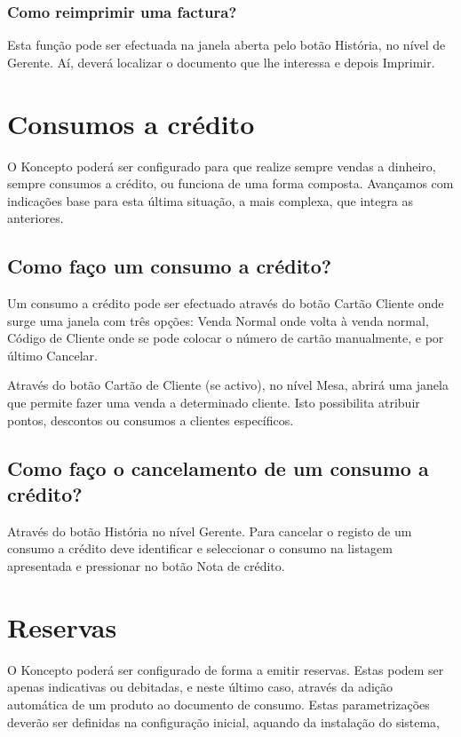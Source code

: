 \documentclass[a4paper,11pt,openany]{memoir}
\begin{document}
\subsection{Como reimprimir uma factura?}
Esta função pode ser efectuada na janela aberta pelo botão História, no nível de
Gerente. Aí, deverá localizar o documento que lhe interessa e depois Imprimir.




\chapter{Consumos a crédito}

O Koncepto poderá ser configurado para que realize sempre vendas a dinheiro,
sempre consumos a crédito, ou funciona de uma forma composta. Avançamos com
indicações base para esta última situação, a mais complexa, que integra as
anteriores.

\section{Como faço um consumo a crédito?}
Um consumo a crédito pode ser efectuado através do botão Cartão Cliente onde
surge uma janela com três opções: Venda Normal onde volta à venda normal,
Código de Cliente onde se pode colocar o número de cartão manualmente, e por
último Cancelar.

Através do botão Cartão de Cliente (se activo), no nível Mesa, abrirá uma janela que
permite fazer uma venda a determinado cliente. Isto possibilita atribuir pontos,
descontos ou consumos a clientes específicos.

\section{Como faço o cancelamento de um consumo a crédito?}
Através do botão História no nível Gerente. Para cancelar o registo de um consumo
a crédito deve identificar e seleccionar o consumo na listagem apresentada e
pressionar no botão Nota de crédito.

\chapter{Reservas}

O Koncepto poderá ser configurado de forma a emitir reservas. Estas podem ser
apenas indicativas ou debitadas, e neste último caso, através da adição automática
de um produto ao documento de consumo. Estas parametrizações deverão ser
definidas na configuração inicial, aquando da instalação do sistema,
\end{document}
